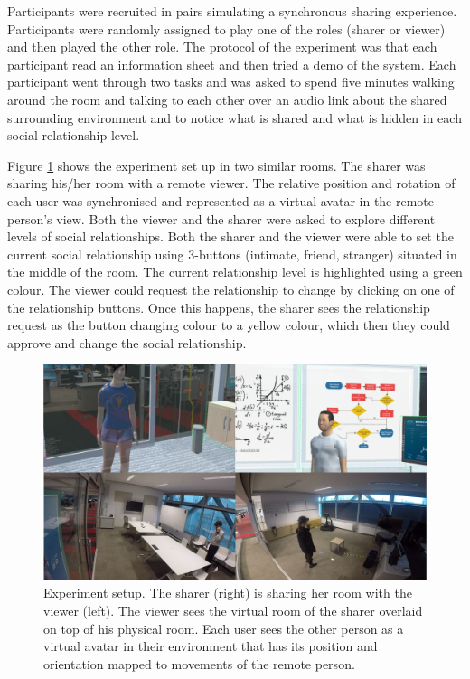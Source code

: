 Participants were recruited in pairs simulating a synchronous sharing experience. Participants were randomly assigned to play one of the roles (sharer or viewer) and then played the other role. The protocol of the experiment was that each participant read an information sheet and then tried a demo of the system. Each participant went through two tasks and was asked to spend five minutes walking around the room and talking to each other over an audio link about the shared surrounding environment and to notice what is shared and what is hidden in each social relationship level. 

Figure \ref{fig:frontier18:setup} shows the experiment set up in two similar rooms. The sharer was sharing his/her room with a remote viewer. The relative position and rotation of each user was synchronised and represented as a virtual avatar in the remote person's view. 
Both the viewer and the sharer were asked to explore different levels of social relationships. Both the sharer and the viewer were able to set the current social relationship using 3-buttons (intimate, friend, stranger) situated in the middle of the room. The current relationship level is highlighted using a green colour. The viewer could request the relationship to change by clicking on one of the relationship buttons. Once this happens, the sharer sees the relationship request as the button changing colour to a yellow colour, which then they could approve and change the social relationship.

\begin{figure}
    \begin{center}
    \includegraphics[width=.8\linewidth]{images/54-hiding-frontier18/synced.png}
    \caption{Experiment setup. The sharer (right) is sharing her room with the viewer (left). The viewer sees the virtual room of the sharer overlaid on top of his physical room. Each user sees the other person as a virtual avatar in their environment that has its position and orientation mapped to movements of the remote person.}
    \label{fig:frontier18:setup}
    \end{center}
\end{figure}

